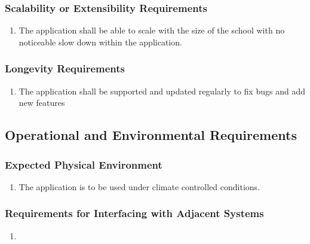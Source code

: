 \documentclass[]{article}
\begin{document}
\subsubsection{Scalability or Extensibility Requirements}
\label{ssub:scalability_or_extensibility_requirements}
\begin{enumerate}[{PR}1. ]
	\item The application shall be able to scale with the size of the school with no noticeable slow down within the application.
\end{enumerate}

\subsubsection{Longevity Requirements}
\label{ssub:longevity_requirements}
\begin{enumerate}[{PR}1. ]
	\item The application shall be supported and updated regularly to fix bugs and
add new features
\end{enumerate}


\subsection{Operational and Environmental Requirements}
\label{sub:operational_and_environmental_requirements}

\subsubsection{Expected Physical Environment}
\label{ssub:expected_physical_environment}
\begin{enumerate}[{OE}1. ]
	\item The application is to be used under climate controlled conditions.
\end{enumerate}

\subsubsection{Requirements for Interfacing with Adjacent Systems}
\label{ssub:requirements_for_interfacing_with_adjacent_systems}
\begin{enumerate}[{OE}1. ]
	\item
\end{enumerate}
\end{document}

